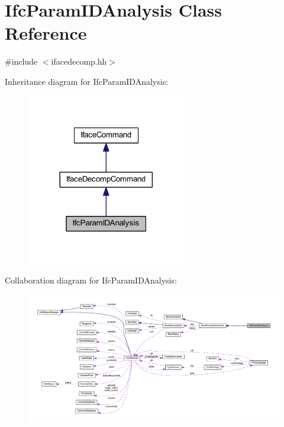 \hypertarget{class_ifc_param_i_d_analysis}{}\section{Ifc\+Param\+I\+D\+Analysis Class Reference}
\label{class_ifc_param_i_d_analysis}


{\ttfamily \#include $<$ifacedecomp.\+hh$>$}



Inheritance diagram for Ifc\+Param\+I\+D\+Analysis\+:
\nopagebreak
\begin{figure}[H]
\begin{center}
\leavevmode
\includegraphics[width=197pt]{class_ifc_param_i_d_analysis__inherit__graph}
\end{center}
\end{figure}


Collaboration diagram for Ifc\+Param\+I\+D\+Analysis\+:
\nopagebreak
\begin{figure}[H]
\begin{center}
\leavevmode
\includegraphics[width=350pt]{class_ifc_param_i_d_analysis__coll__graph}
\end{center}
\end{figure}
